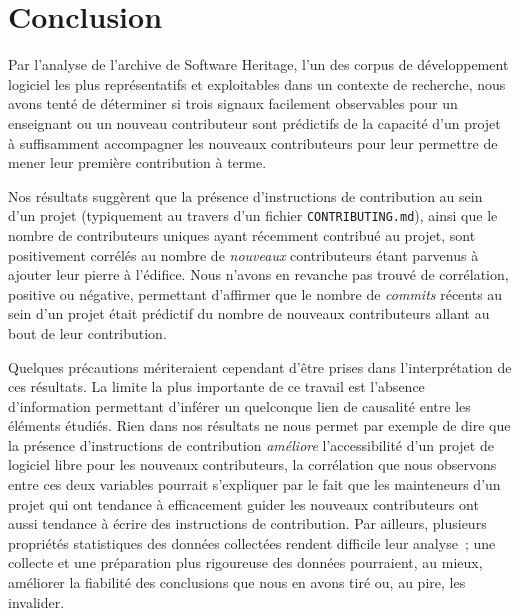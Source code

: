 \documentclass[dvipsnames,runningheads]{llncs}
\newcommand{\en}[1]{\foreignlanguage{english}{\emph{#1}}}
\begin{document}
    \section{Conclusion}

    Par l'analyse de l'archive de Software Heritage, l'un des corpus de développement logiciel les plus
    représentatifs et exploitables dans un contexte de recherche, nous avons tenté de déterminer si trois
    signaux facilement observables pour un enseignant ou un nouveau contributeur sont prédictifs de la
    capacité d'un projet à suffisamment accompagner les nouveaux contributeurs pour leur permettre de mener
    leur première contribution à terme.

    Nos résultats suggèrent que la présence d'instructions de contribution au sein d'un projet (typiquement au
    travers d'un fichier \texttt{CONTRIBUTING.md}), ainsi que le nombre de contributeurs uniques ayant
    récemment contribué au projet, sont positivement corrélés au nombre de \emph{nouveaux} contributeurs étant
    parvenus à ajouter leur pierre à l'édifice. Nous n'avons en revanche pas trouvé de corrélation, positive
    ou négative, permettant d'affirmer que le nombre de \en{commits} récents au sein d'un projet était
    prédictif du nombre de nouveaux contributeurs allant au bout de leur contribution.

    Quelques précautions mériteraient cependant d'être prises dans l'interprétation de ces résultats. La
    limite la plus importante de ce travail est l'absence d'information permettant d'inférer un quelconque
    lien de causalité entre les éléments étudiés. Rien dans nos résultats ne nous permet par exemple de dire
    que la présence d'instructions de contribution \emph{améliore} l'accessibilité d'un projet de logiciel
    libre pour les nouveaux contributeurs, la corrélation que nous observons entre ces deux variables pourrait
    s'expliquer par le fait que les mainteneurs d'un projet qui ont tendance à efficacement guider les
    nouveaux contributeurs ont aussi tendance à écrire des instructions de contribution. Par ailleurs,
    plusieurs propriétés statistiques des données collectées rendent difficile leur analyse ; une collecte et
    une préparation plus rigoureuse des données pourraient, au mieux, améliorer la fiabilité des conclusions
    que nous en avons tiré ou, au pire, les invalider.
\end{document}
